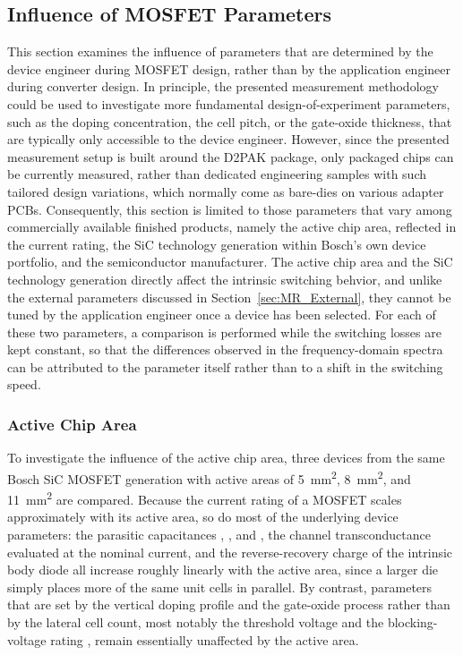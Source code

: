 \subsection{Influence of MOSFET Parameters}
\label{sec:MR_MOSFET}

This section examines the influence of parameters that are determined by the device engineer during MOSFET design, rather than by the application engineer during converter design.
In principle, the presented measurement methodology could be used to investigate more fundamental design-of-experiment parameters, such as the doping concentration, the cell pitch, or the gate-oxide thickness, that are typically only accessible to the device engineer.
However, since the presented measurement setup is built around the D2PAK package, only packaged chips can be currently measured, rather than dedicated engineering samples with such tailored design variations, which normally come as bare-dies on various adapter PCBs.
Consequently, this section is limited to those parameters that vary among commercially available finished products, namely the active chip area, reflected in the current rating, the SiC technology generation within Bosch's own device portfolio, and the semiconductor manufacturer.
The active chip area and the SiC technology generation directly affect the intrinsic switching behvior, and unlike the external parameters discussed in Section~\ref{sec:MR_External}, they cannot be tuned by the application engineer once a device has been selected.
For each of these two parameters, a comparison is performed while the switching losses are kept constant, so that the differences observed in the frequency-domain spectra can be attributed to the parameter itself rather than to a shift in the switching speed.

\subsubsection*{Active Chip Area}

To investigate the influence of the active chip area, three devices from the same Bosch SiC MOSFET generation with active areas of \SI{5}{mm^2}, \SI{8}{mm^2}, and \SI{11}{mm^2} are compared.
Because the current rating of a MOSFET scales approximately with its active area, so do most of the underlying device parameters: the parasitic capacitances , , and , the channel transconductance  evaluated at the nominal current, and the reverse-recovery charge  of the intrinsic body diode all increase roughly linearly with the active area, since a larger die simply places more of the same unit cells in parallel.
By contrast, parameters that are set by the vertical doping profile and the gate-oxide process rather than by the lateral cell count, most notably the threshold voltage  and the blocking-voltage rating , remain essentially unaffected by the active area.

